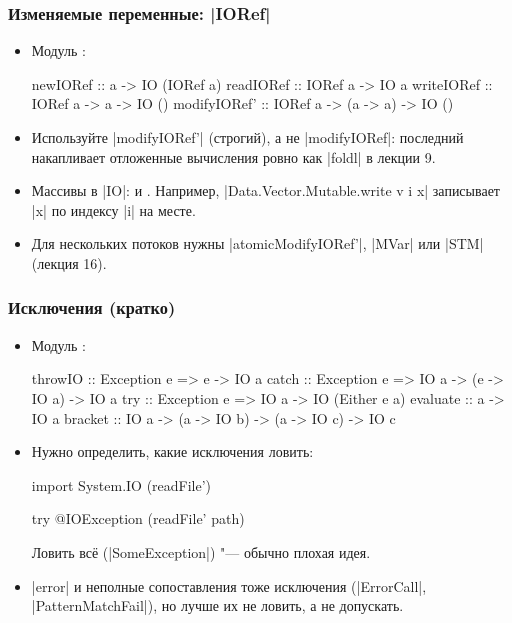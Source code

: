 \documentclass[11pt]{beamer}
\begin{document}
\begin{frame}[fragile]
  \frametitle{Изменяемые переменные: \haskinline|IORef|}
  \begin{itemize}
    \item Модуль \href{https://hackage.haskell.org/package/base/docs/Data-IORef.html}{}:
          \begin{haskell}
            newIORef :: a -> IO (IORef a)
            readIORef :: IORef a -> IO a
            writeIORef :: IORef a -> a -> IO ()
            modifyIORef' :: IORef a -> (a -> a) -> IO ()
          \end{haskell}
    \item Используйте \haskinline|modifyIORef'| (строгий), а не \haskinline|modifyIORef|: последний накапливает отложенные вычисления ровно как \haskinline|foldl| в лекции 9.
    \item Массивы в \haskinline|IO|: \href{https://hackage.haskell.org/package/array/docs/Data-Array-IO.html#t:IOArray}{} и \href{https://hackage.haskell.org/package/vector/docs/Data-Vector-Mutable.html#t:IOVector}{}. Например, \haskinline|Data.Vector.Mutable.write v i x| записывает \haskinline|x| по индексу \haskinline|i| на месте.
    \item Для нескольких потоков нужны \haskinline|atomicModifyIORef'|, \haskinline|MVar| или \haskinline|STM| (лекция 16).
  \end{itemize}
\end{frame}

\begin{frame}[fragile]
  \frametitle{Исключения (кратко)}
  \begin{itemize}
    \item Модуль \href{https://hackage.haskell.org/package/base/docs/Control-Exception.html}{}:
          \begin{haskellsmall}
            throwIO :: Exception e => e -> IO a
            catch   :: Exception e => IO a -> (e -> IO a) -> IO a
            try     :: Exception e => IO a -> IO (Either e a)
            evaluate :: a -> IO a
            bracket :: IO a -> (a -> IO b) -> (a -> IO c) -> IO c
          \end{haskellsmall}
    \item Нужно определить, какие исключения ловить:
          \begin{haskellsmall}
            import System.IO (readFile')

            try @IOException (readFile' path)
          \end{haskellsmall}
          Ловить всё (\haskinline|SomeException|) "--- обычно плохая идея.
    \item \haskinline|error| и неполные сопоставления тоже исключения (\haskinline|ErrorCall|, \haskinline|PatternMatchFail|), но лучше их не ловить, а не допускать.
  \end{itemize}
\end{frame}
\end{document}
